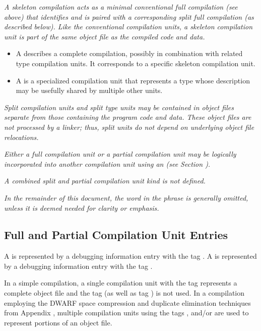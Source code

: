 \textit{A skeleton compilation acts as a minimal conventional full
compilation (see above) that identifies and is paired with a 
corresponding split full compilation (as described below). Like
the conventional compilation units, a skeleton compilation unit
is part of the same object file as the compiled code and data.}

\begin{itemize}
\item A 
 describes
a complete compilation, possibly in combination with
related type compilation units. It corresponds 
to a specific skeleton compilation unit.

\item A  is a specialized
compilation unit that represents a type whose description may
be usefully shared by multiple other units.

\end{itemize}

\textit{Split compilation units and split type units may be 
contained in object files separate from those containing the 
program code and data.
These object files are not processed by a linker; thus,
split units do not depend on underlying object file relocations.}

\textit{Either a full compilation unit or a partial compilation 
unit may be logically incorporated into another compilation unit 
using an 
(see Section ).}

\textit{A
combined split and partial
compilation unit kind is not defined.}

\textit{In the remainder of this document, the word 
 in the phrase  
is generally omitted, unless it is deemed needed for clarity 
or emphasis.}

\subsection{Full and Partial Compilation Unit Entries}
\label{chap:fullandpartialcompilationunitentries}
A  
is represented by a debugging information entry with the tag 
\DWTAGcompileunitTARG. 
A  
is represented by a debugging information entry with the tag 
\DWTAGpartialunitTARG.

In a simple compilation, a single compilation unit with
the tag 
\DWTAGcompileunit{} represents a complete object file
and the tag 
\DWTAGpartialunit{} (as well as tag \DWTAGtypeunit) is not used. 
In a compilation
employing the DWARF space compression and duplicate elimination
techniques from 
Appendix , 
multiple compilation units using
the tags 
\DWTAGcompileunit{}, 
\DWTAGpartialunit{} and/or 
\DWTAGtypeunit{} 
are used to represent portions of an object file.

